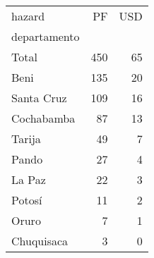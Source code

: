 \begin{tabular}{lrr}
\toprule
hazard &   PF &  USD \\
departamento &      &      \\
\midrule
Total        &  450 &   65 \\
Beni         &  135 &   20 \\
Santa Cruz   &  109 &   16 \\
Cochabamba   &   87 &   13 \\
Tarija       &   49 &    7 \\
Pando        &   27 &    4 \\
La Paz       &   22 &    3 \\
Potosí       &   11 &    2 \\
Oruro        &    7 &    1 \\
Chuquisaca   &    3 &    0 \\
\bottomrule
\end{tabular}
